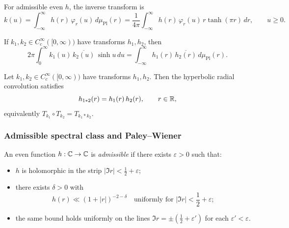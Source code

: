 For admissible even $h$, the inverse transform is
\begin{equation}\label{eq:spherical-inversion}
k(u)
=
\int_{-\infty}^{\infty} h(r)\,\varphi_{r}(u)\,d\mu_{\mathrm{Pl}}(r)
=
\frac{1}{4\pi}\int_{-\infty}^{\infty} h(r)\,\varphi_{r}(u)\,r\tanh(\pi r)\,dr,
\qquad u\ge 0.
\end{equation}

\begin{lemma}\label{lem:selberg-plancherel}
If $k_1,k_2\in C_c^\infty([0,\infty))$ have transforms $h_1,h_2$, then
\begin{equation}\label{eq:plancherel}
2\pi\int_{0}^{\infty} k_1(u)\,\overline{k_2(u)}\,\sinh u\,du
=
\int_{-\infty}^{\infty} h_1(r)\,\overline{h_2(r)}\,d\mu_{\mathrm{Pl}}(r).
\end{equation}
\end{lemma}

\begin{lemma}[Convolution]\label{lem:selberg-convolution}
Let $k_1,k_2\in C_c^\infty([0,\infty))$ have transforms $h_1,h_2$.
Then the hyperbolic radial convolution satisfies
\begin{equation}\label{eq:conv-mult}
h_{1*2}(r)=h_1(r)\,h_2(r),
\qquad r\in\mathbb{R},
\end{equation}
equivalently $T_{k_1}\circ T_{k_2}=T_{k_1*k_2}$.
\end{lemma}

\subsubsection{Admissible spectral class and Paley--Wiener}\label{subsec:admissible-paley-wiener}

\begin{definition}\label{def:admissible-Hh}
An even function $h:\mathbb{C}\to\mathbb{C}$ is \emph{admissible} if there exists $\varepsilon>0$ such that:
\begin{itemize}
\item[(H1)] $h$ is holomorphic in the strip $|\Im r|<\frac12+\varepsilon$;
\item[(H2)] there exists $\delta>0$ with
\[
h(r)\ll (1+|r|)^{-2-\delta}
\quad\text{uniformly for }|\Im r|<\frac12+\varepsilon;
\]
\item[(H3)] the same bound holds uniformly on the lines $\Im r=\pm(\frac12+\varepsilon')$
for each $\varepsilon'<\varepsilon$.
\end{itemize}
\end{definition}

